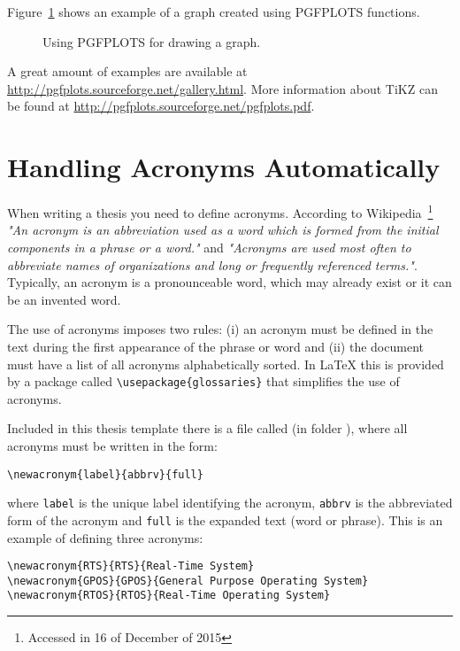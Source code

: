 Figure~\ref{fig:pgfplots} shows an example of a graph created using PGFPLOTS functions.

\begin{figure}[h]
\centering
{}
\caption{Using PGFPLOTS for drawing a graph.}
\label{fig:pgfplots}
\end{figure}

A great amount of examples are available at \url{http://pgfplots.sourceforge.net/gallery.html}. 
More information about TiKZ can be found at 
\url{http://pgfplots.sourceforge.net/pgfplots.pdf}.


\section{Handling Acronyms Automatically}
When writing a thesis you need to define acronyms.
According to Wikipedia~\footnote{Accessed in 16 of December of 2015} \textit{"An acronym is an abbreviation used as a word which is formed from the initial components in a phrase or a word."} and
\textit{"Acronyms are used most often to abbreviate names of organizations and long or frequently referenced terms."}.
Typically, an acronym is a pronounceable word, which may already exist or it can be an invented word. 

The use of acronyms imposes two rules: (i) an acronym must be defined in the text during the first appearance of the phrase or word and (ii) the document must have a list of all acronyms alphabetically sorted. In \LaTeX{} this is provided by a package called \verb|\usepackage{glossaries}| that simplifies the use of acronyms. 

Included in this thesis template there is a file called  (in folder ), where all acronyms must be written in the form:
\begin{verbatim}
\newacronym{label}{abbrv}{full}
\end{verbatim}
where \verb|label| is the unique label identifying the acronym, \verb|abbrv| is the abbreviated form of the acronym and \verb|full| is the expanded text (word or phrase). This is an example of defining three acronyms:
\begin{verbatim}
\newacronym{RTS}{RTS}{Real-Time System}
\newacronym{GPOS}{GPOS}{General Purpose Operating System}
\newacronym{RTOS}{RTOS}{Real-Time Operating System}
\end{verbatim}

